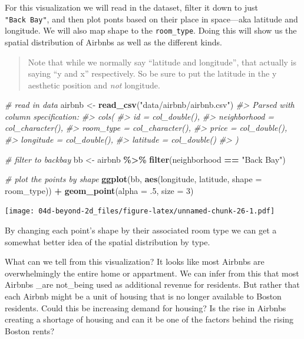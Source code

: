 \documentclass[
]{book}
\newenvironment{Shaded}{\begin{snugshade}}{\end{snugshade}}
\newcommand{\CommentTok}[1]{\textcolor[rgb]{0.56,0.35,0.01}{\textit{#1}}}
\newcommand{\DataTypeTok}[1]{\textcolor[rgb]{0.13,0.29,0.53}{#1}}
\newcommand{\DecValTok}[1]{\textcolor[rgb]{0.00,0.00,0.81}{#1}}
\newcommand{\FloatTok}[1]{\textcolor[rgb]{0.00,0.00,0.81}{#1}}
\newcommand{\KeywordTok}[1]{\textcolor[rgb]{0.13,0.29,0.53}{\textbf{#1}}}
\newcommand{\NormalTok}[1]{#1}
\newcommand{\OperatorTok}[1]{\textcolor[rgb]{0.81,0.36,0.00}{\textbf{#1}}}
\newcommand{\StringTok}[1]{\textcolor[rgb]{0.31,0.60,0.02}{#1}}
\begin{document}
For this visualization we will read in the dataset, filter it down to just \texttt{"Back\ Bay"}, and then plot ponts based on their place in space---aka latitude and longitude. We will also map shape to the \texttt{room\_type}. Doing this will show us the spatial distribution of Airbnbs as well as the different kinds.

\begin{quote}
Note that while we normally say ``latitude and longitude'', that actually is saying ``y and x'' respectively. So be sure to put the latitude in the y aesthetic position and \emph{not} longitude.
\end{quote}

\begin{Shaded}
\begin{Highlighting}[]
\CommentTok{\# read in data}
\NormalTok{airbnb \textless{}{-}}\StringTok{ }\KeywordTok{read\_csv}\NormalTok{(}\StringTok{"data/airbnb/airbnb.csv"}\NormalTok{)}
\CommentTok{\#\textgreater{} Parsed with column specification:}
\CommentTok{\#\textgreater{} cols(}
\CommentTok{\#\textgreater{}   id = col\_double(),}
\CommentTok{\#\textgreater{}   neighborhood = col\_character(),}
\CommentTok{\#\textgreater{}   room\_type = col\_character(),}
\CommentTok{\#\textgreater{}   price = col\_double(),}
\CommentTok{\#\textgreater{}   longitude = col\_double(),}
\CommentTok{\#\textgreater{}   latitude = col\_double()}
\CommentTok{\#\textgreater{} )}

\CommentTok{\# filter to backbay}
\NormalTok{bb \textless{}{-}}\StringTok{ }\NormalTok{airbnb }\OperatorTok{\%\textgreater{}\%}\StringTok{ }
\StringTok{  }\KeywordTok{filter}\NormalTok{(neighborhood }\OperatorTok{==}\StringTok{ "Back Bay"}\NormalTok{) }

\CommentTok{\# plot the points by shape}
\KeywordTok{ggplot}\NormalTok{(bb,  }\KeywordTok{aes}\NormalTok{(longitude, latitude, }\DataTypeTok{shape =}\NormalTok{ room\_type)) }\OperatorTok{+}\StringTok{ }
\StringTok{  }\KeywordTok{geom\_point}\NormalTok{(}\DataTypeTok{alpha =} \FloatTok{.5}\NormalTok{, }\DataTypeTok{size =} \DecValTok{3}\NormalTok{) }
\end{Highlighting}
\end{Shaded}

\texttt{[image: 04d-beyond-2d\_files/figure-latex/unnamed-chunk-26-1.pdf]}

By changing each point's shape by their associated room type we can get a somewhat better idea of the spatial distribution by type.

What can we tell from this visualization? It looks like most Airbnbs are overwhelmingly the entire home or appartment. We can infer from this that most Airbnbs \_are not\_being used as additional revenue for residents. But rather that each Airbnb might be a unit of housing that is no longer available to Boston residents. Could this be increasing demand for housing? Is the rise in Airbnbs creating a shortage of housing and can it be one of the factors behind the rising Boston rents?
\end{document}
